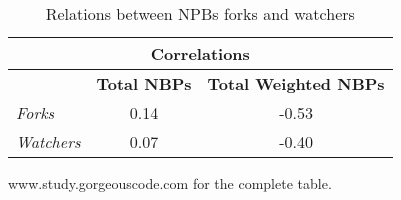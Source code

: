 \begin{table}[H]
\begin{center}
{\scriptsize
\begin{threeparttable}
\begin{tabular}{|l||c|c|} \hline
\multicolumn{3}{|c|}{Correlations} \\ \hline
                       & \textbf{Total NBPs}  & \textbf{Total Weighted NBPs}  \\ \hline\hline
\emph{Forks         }  & 0.14                 & -0.53                       \\ \hline
\emph{Watchers      }  & 0.07                 & -0.40                       \\ \hline
\end{tabular}
\begin{tablenotes}
  \item www.study.gorgeouscode.com for the complete table.
\end{tablenotes}
\end{threeparttable}
}
\end{center}
\caption{Relations between NPBs forks and watchers}
\label{tab:rbpresults_2}
\end{table}